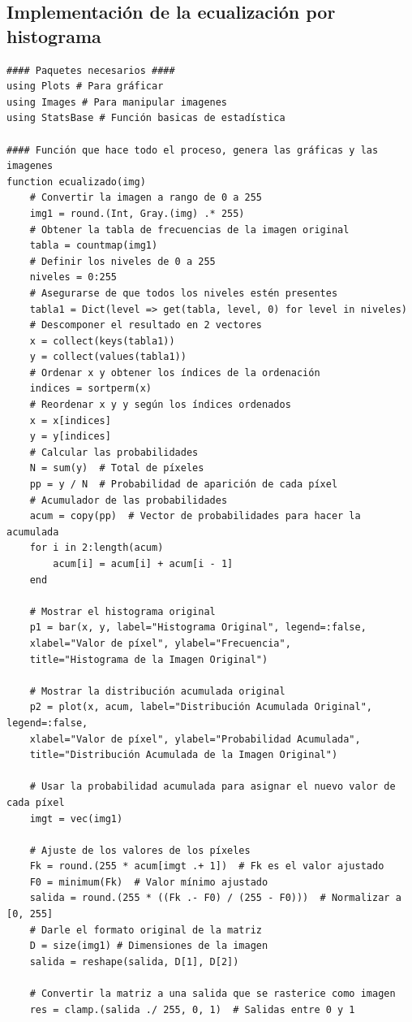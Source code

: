 \documentclass[11pt, letterpaper]{article}
\begin{document}
\subsection{Implementación de la ecualización por histograma}
\begin{verbatim}
#### Paquetes necesarios ####
using Plots # Para gráficar
using Images # Para manipular imagenes
using StatsBase # Función basicas de estadística

#### Función que hace todo el proceso, genera las gráficas y las imagenes
function ecualizado(img)
	# Convertir la imagen a rango de 0 a 255
	img1 = round.(Int, Gray.(img) .* 255)
	# Obtener la tabla de frecuencias de la imagen original
	tabla = countmap(img1)
	# Definir los niveles de 0 a 255 
	niveles = 0:255
	# Asegurarse de que todos los niveles estén presentes
	tabla1 = Dict(level => get(tabla, level, 0) for level in niveles)
	# Descomponer el resultado en 2 vectores
	x = collect(keys(tabla1))
	y = collect(values(tabla1))
	# Ordenar x y obtener los índices de la ordenación
	indices = sortperm(x)
	# Reordenar x y y según los índices ordenados
	x = x[indices]
	y = y[indices]
	# Calcular las probabilidades
	N = sum(y)  # Total de píxeles
	pp = y / N  # Probabilidad de aparición de cada píxel
	# Acumulador de las probabilidades
	acum = copy(pp)  # Vector de probabilidades para hacer la acumulada
	for i in 2:length(acum)
		acum[i] = acum[i] + acum[i - 1]
	end
	
	# Mostrar el histograma original
	p1 = bar(x, y, label="Histograma Original", legend=:false, 
	xlabel="Valor de píxel", ylabel="Frecuencia",
	title="Histograma de la Imagen Original")
	
	# Mostrar la distribución acumulada original
	p2 = plot(x, acum, label="Distribución Acumulada Original", legend=:false,
	xlabel="Valor de píxel", ylabel="Probabilidad Acumulada",
	title="Distribución Acumulada de la Imagen Original")
	
	# Usar la probabilidad acumulada para asignar el nuevo valor de cada píxel
	imgt = vec(img1)
	
	# Ajuste de los valores de los píxeles
	Fk = round.(255 * acum[imgt .+ 1])  # Fk es el valor ajustado
	F0 = minimum(Fk)  # Valor mínimo ajustado
	salida = round.(255 * ((Fk .- F0) / (255 - F0)))  # Normalizar a [0, 255]
	# Darle el formato original de la matriz
	D = size(img1) # Dimensiones de la imagen
	salida = reshape(salida, D[1], D[2])
	
	# Convertir la matriz a una salida que se rasterice como imagen
	res = clamp.(salida ./ 255, 0, 1)  # Salidas entre 0 y 1
	

\end{verbatim}
\end{document}
